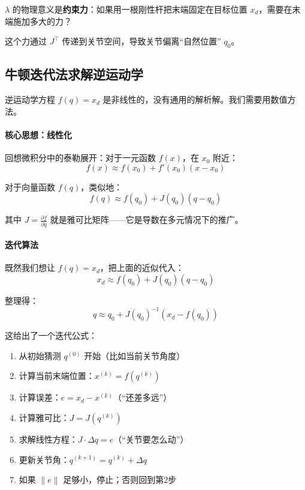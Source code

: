 \begin{physicalmeaning}
$\lambda$ 的物理意义是\textbf{约束力}：如果用一根刚性杆把末端固定在目标位置 $x_d$，需要在末端施加多大的力？

这个力通过 $J^\top$ 传递到关节空间，导致关节偏离“自然位置” $q_0$。
\end{physicalmeaning}

\subsection{牛顿迭代法求解逆运动学}

逆运动学方程 $f(q) = x_d$ 是非线性的，没有通用的解析解。我们需要用数值方法。

\paragraph{核心思想：线性化}

回想微积分中的泰勒展开：对于一元函数 $f(x)$，在 $x_0$ 附近：
\[
f(x) \approx f(x_0) + f'(x_0)(x - x_0)
\]

对于向量函数 $f(q)$，类似地：
\[
f(q) \approx f(q_0) + J(q_0)(q - q_0)
\]

其中 $J = \frac{\partial f}{\partial q}$ 就是雅可比矩阵——它是导数在多元情况下的推广。

\paragraph{迭代算法}

既然我们想让 $f(q) = x_d$，把上面的近似代入：
\[
x_d \approx f(q_0) + J(q_0)(q - q_0)
\]

整理得：
\[
q \approx q_0 + J(q_0)^{-1}(x_d - f(q_0))
\]

这给出了一个迭代公式：

\begin{enumerate}
    \item 从初始猜测 $q^{(0)}$ 开始（比如当前关节角度）
    \item 计算当前末端位置：$x^{(k)} = f(q^{(k)})$
    \item 计算误差：$e = x_d - x^{(k)}$（“还差多远”）
    \item 计算雅可比：$J = J(q^{(k)})$
    \item 求解线性方程：$J \cdot \Delta q = e$（“关节要怎么动”）
    \item 更新关节角：$q^{(k+1)} = q^{(k)} + \Delta q$
    \item 如果 $\|e\|$ 足够小，停止；否则回到第2步
\end{enumerate}

